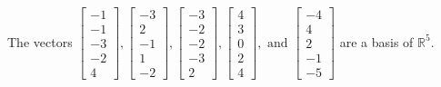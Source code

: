 \begin{exercise}
\begin{exerciseStatement}
  \end{exerciseStatement}
  \begin{exerciseAnswer}
   The vectors \(\left[\begin{array}{r}
-1 \\
-1 \\
-3 \\
-2 \\
4
\end{array}\right] , \left[\begin{array}{r}
-3 \\
2 \\
-1 \\
1 \\
-2
\end{array}\right] , \left[\begin{array}{r}
-3 \\
-2 \\
-2 \\
-3 \\
2
\end{array}\right] , \left[\begin{array}{r}
4 \\
3 \\
0 \\
2 \\
4
\end{array}\right] , \text{ and } \left[\begin{array}{r}
-4 \\
4 \\
2 \\
-1 \\
-5
\end{array}\right]\) 
  	 are  a basis of \(\mathbb{R}^5\).
  


  \end{exerciseAnswer}
\end{exercise}